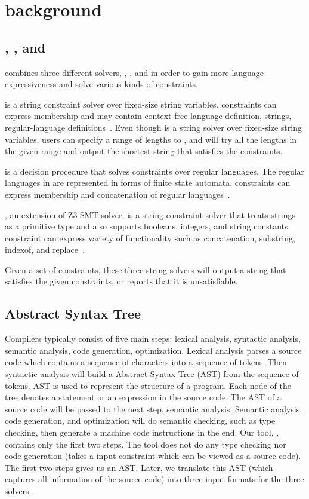 \section{background}
\label{sec:background}


\subsection{\hampi, \dprle, and \zstr}
\imss combines three different solvers, \hampi, \dprle, and \zstr in order to gain more
language expressiveness and solve various kinds of constraints.

\hampi is a string constraint solver over fixed-size string variables. \hampi constraints can express
membership and may contain context-free language definition, strings, regular-language
definitions~\cite{hampi2009}. Even though \hampi is a string solver over fixed-size string variables,
users can specify a range of lengths to \hampi, and \hampi will try all the lengths in the given range
and output the shortest string that satisfies the constraints.

\dprle is a decision procedure that solves constraints over regular languages. The regular languages
in \dprle are represented in forms of finite state automata. \dprle constraints can express
membership and concatenation of regular languages~\cite{dprle2009}.

\zstr, an extension of Z3 SMT solver, is a string constraint solver that treats strings
as a primitive type and also supports booleans, integers, and string constants.
\zstr constraint can express variety of functionality such as concatenation, substring,
indexof, and replace~\cite{z32013}.

Given a set of constraints, these three string solvers will output a string that satisfies the given constraints, or reports that it is unsatisfiable.

\subsection{Abstract Syntax Tree}
Compilers typically consist of five main steps: lexical analysis, syntactic analysis, semantic
analysis, code generation, optimization. Lexical analysis parses a source code which contains
a sequence of characters into a sequence of tokens. Then syntactic analysis will build a
Abstract Syntax Tree (AST) from the sequence of tokens. AST is used to represent the structure
of a program. Each node of the tree denotes a statement or an expression in the source code.
The AST of a source code will be passed to the next step, semantic analysis.
Semantic analysis, code generation, and optimization will do semantic checking, such as type checking,
then generate a machine code instructions in the end. Our tool, \imss, contains only the first two steps.
The tool does not do any type checking nor code generation (\imss takes a input constraint which can be
viewed as a source code). The first two steps gives us an AST.
Later, we translate this AST (which captures all information of the source code) into three input formats
for the three solvers.

